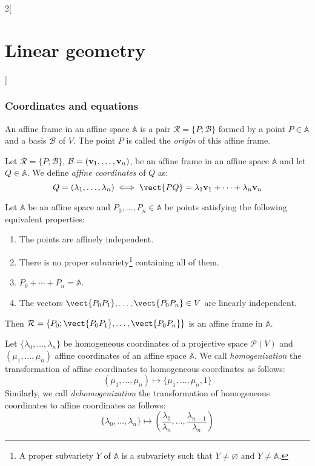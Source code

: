 \documentclass[../../../main_math.tex]{subfiles}
\begin{document}
\begin{multicols}{2}[\section{Linear geometry}]
  \subsubsection{Coordinates and equations}
  \begin{definition}
    An affine frame in an affine space $\mathbb{A}$ is a pair $\mathcal{R}=\{P;\mathcal{B}\}$ formed by a point $P\in\mathbb{A}$ and a basis $\mathcal{B}$ of $V$. The point $P$ is called the \emph{origin} of this affine frame.
  \end{definition}
  \begin{definition}
    Let $\mathcal{R}=\{P;\mathcal{B}\}$, $\mathcal{B}=(\boldsymbol{\mathrm{v}}_1,\ldots,\boldsymbol{\mathrm{v}}_n)$, be an affine frame in an affine space $\mathbb{A}$ and let $Q\in\mathbb{A}$. We define \emph{affine coordinates} of $Q$ as: $$Q=(\lambda_1,\ldots,\lambda_n)\iff\vect{PQ}=\lambda_1\vf{v}_1+\cdots+\lambda_n\vf{v}_n$$
  \end{definition}
  \begin{proposition}
    Let $\mathbb{A}$ be an affine space and $P_0,\ldots,P_n\in\mathbb{A}$ be points satisfying the following equivalent properties:
    \begin{enumerate}
      \item The points are affinely independent.
      \item There is no proper subvariety\footnote{A proper subvariety $Y$ of $\mathbb{A}$ is a subvariety such that $Y\ne\varnothing$ and  $Y\ne\mathbb{A}$.} containing all of them.
      \item $P_0+\cdots+P_n=\mathbb{A}$.
      \item The vectors $\vect{P_0P_1},\ldots,\vect{P_0P_n}\in V$ are linearly independent.
    \end{enumerate}
    Then $\mathcal{R}=\{P_0;\vect{P_0P_1},\ldots,\vect{P_0P_n}\}$ is an affine frame in $\mathbb{A}$.
  \end{proposition}
  \begin{definition}
    Let $\{\lambda_0,\ldots,\lambda_n\}$ be homogeneous coordinates of a projective space $\mathcal{P}(V)$ and $(\mu_1,\ldots,\mu_n)$ affine coordinates of an affine space $\mathbb{A}$. We call \emph{homogenization} the transformation of affine coordinates to homogeneous coordinates as follows: $$(\mu_1,\ldots,\mu_n)\longmapsto\{\mu_1,\ldots,\mu_n,1\}$$ Similarly, we call \emph{dehomogenization} the transformation of homogeneous coordinates to affine coordinates as follows: $$\{\lambda_0,\ldots,\lambda_n\}\longmapsto\left(\frac{\lambda_0}{\lambda_n},\ldots,\frac{\lambda_{n-1}}{\lambda_n}\right)$$

\end{definition}
\end{multicols}
\end{document}
